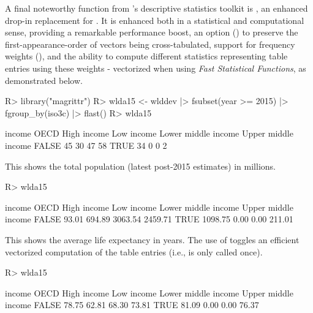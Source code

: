 \documentclass[nojss]{jss} %
\newcommand{\fct}[1]{\code{#1()}}
\begin{document}
A final noteworthy function from 's descriptive statistics toolkit is \fct{qtab}, an enhanced drop-in replacement for . It is enhanced both in a statistical and computational sense, providing a remarkable performance boost, an option () to preserve the first-appearance-order of vectors being cross-tabulated, support for frequency weights (), and the ability to compute different statistics representing table entries using these weights - vectorized when using \emph{Fast Statistical Functions}, as demonstrated below.
%
\begin{Schunk}
\begin{Sinput}
R> library("magrittr")
R> wlda15 <- wlddev |> fsubset(year >= 2015) |> fgroup_by(iso3c) |> flast()
R> wlda15 %$% qtab(OECD, income)
\end{Sinput}
\begin{Soutput}
       income
OECD    High income Low income Lower middle income Upper middle income
  FALSE          45         30                  47                  58
  TRUE           34          0                   0                   2
\end{Soutput}
\end{Schunk}
This shows the total population (latest post-2015 estimates) in millions.
\begin{Schunk}
\begin{Sinput}
R> wlda15 %$% qtab(OECD, income, w = POP) %>% divide_by(1e6)
\end{Sinput}
\begin{Soutput}
       income
OECD    High income Low income Lower middle income Upper middle income
  FALSE       93.01     694.89             3063.54             2459.71
  TRUE      1098.75       0.00                0.00              211.01
\end{Soutput}
\end{Schunk}
This shows the average life expectancy in years. The use of \fct{fmean} toggles an efficient vectorized computation of the table entries (i.e., \fct{fmean} is only called once).
\begin{Schunk}
\begin{Sinput}
R> wlda15 %$% qtab(OECD, income, w = LIFEEX, wFUN = fmean) %>% replace_na(0)
\end{Sinput}
\begin{Soutput}
       income
OECD    High income Low income Lower middle income Upper middle income
  FALSE       78.75      62.81               68.30               73.81
  TRUE        81.09       0.00                0.00               76.37
\end{Soutput}
\end{Schunk}
\end{document}
